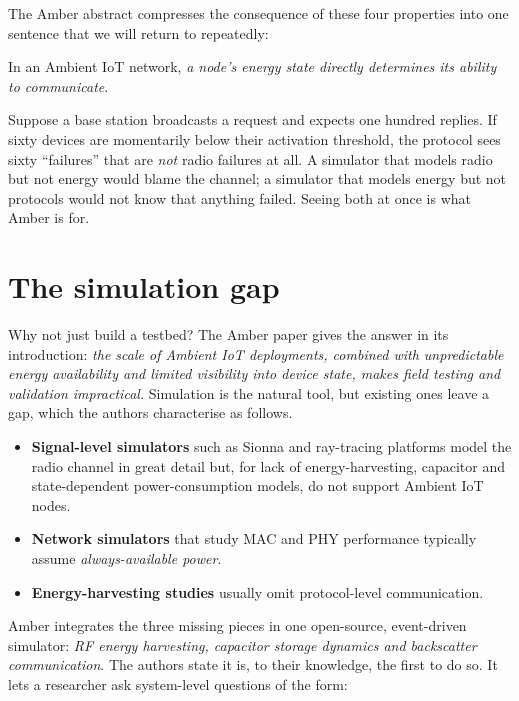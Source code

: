 The Amber abstract compresses the consequence of these four properties into
one sentence that we will return to repeatedly:

\begin{keyidea}
In an Ambient IoT network, \emph{a node's energy state directly determines
its ability to communicate}.
\end{keyidea}

Suppose a base station broadcasts a request and expects one hundred replies. If
sixty devices are momentarily below their activation threshold, the
protocol sees sixty ``failures'' that are \emph{not} radio failures at all.
A simulator that models radio but not energy would blame the channel; a
simulator that models energy but not protocols would not know that anything
failed. Seeing both at once is what Amber is for.

\section{The simulation gap}
\label{sec:gap}

Why not just build a testbed? The Amber paper gives the answer in its introduction:
\emph{the scale of Ambient IoT deployments, combined with unpredictable energy
availability and limited visibility into device state, makes field testing and
validation impractical.} Simulation is the natural tool, but existing ones
leave a gap, which the authors characterise as follows.
\begin{itemize}
 \item \textbf{Signal-level simulators} such as Sionna \citep{hoydis2022sionna}
   and ray-tracing platforms \citep{tarneberg2023raytracing} model the radio
   channel in great detail but, for lack of energy-harvesting, capacitor and
   state-dependent power-consumption models, do not support Ambient IoT nodes.
 \item \textbf{Network simulators} that study MAC and PHY performance
   typically assume \emph{always-available power}.
 \item \textbf{Energy-harvesting studies} usually omit protocol-level
   communication.
\end{itemize}
Amber integrates the three missing pieces in one open-source, event-driven
simulator: \emph{RF energy harvesting, capacitor storage dynamics and
backscatter communication}. The authors state it is, to their knowledge, the
first to do so. It lets a researcher ask system-level questions of the form:

